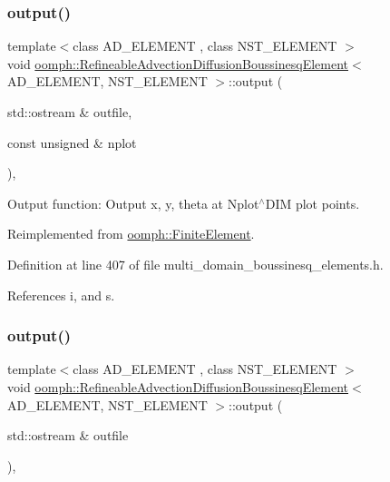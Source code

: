 \subsubsection{\texorpdfstring{output()}{output()}\hspace{0.1cm}{\footnotesize\ttfamily [1/4]}}
{\footnotesize\ttfamily template$<$class A\+D\+\_\+\+E\+L\+E\+M\+E\+NT , class N\+S\+T\+\_\+\+E\+L\+E\+M\+E\+NT $>$ \\
void \hyperlink{classoomph_1_1RefineableAdvectionDiffusionBoussinesqElement}{oomph\+::\+Refineable\+Advection\+Diffusion\+Boussinesq\+Element}$<$ A\+D\+\_\+\+E\+L\+E\+M\+E\+NT, N\+S\+T\+\_\+\+E\+L\+E\+M\+E\+NT $>$\+::output (\begin{DoxyParamCaption}\item[{std\+::ostream \&}]{outfile,  }\item[{const unsigned \&}]{nplot }\end{DoxyParamCaption})\hspace{0.3cm}{\ttfamily [inline]}, {\ttfamily [virtual]}}



Output function\+: Output x, y, theta at Nplot$^\wedge$\+D\+IM plot points. 



Reimplemented from \hyperlink{classoomph_1_1FiniteElement_afa9d9b2670f999b43e6679c9dd28c457}{oomph\+::\+Finite\+Element}.



Definition at line 407 of file multi\+\_\+domain\+\_\+boussinesq\+\_\+elements.\+h.



References i, and s.

\mbox{\label{classoomph_1_1RefineableAdvectionDiffusionBoussinesqElement_ae56c984aaa1aeddf1f458e700ffbe6a1}} 
\subsubsection{\texorpdfstring{output()}{output()}\hspace{0.1cm}{\footnotesize\ttfamily [2/4]}}
{\footnotesize\ttfamily template$<$class A\+D\+\_\+\+E\+L\+E\+M\+E\+NT , class N\+S\+T\+\_\+\+E\+L\+E\+M\+E\+NT $>$ \\
void \hyperlink{classoomph_1_1RefineableAdvectionDiffusionBoussinesqElement}{oomph\+::\+Refineable\+Advection\+Diffusion\+Boussinesq\+Element}$<$ A\+D\+\_\+\+E\+L\+E\+M\+E\+NT, N\+S\+T\+\_\+\+E\+L\+E\+M\+E\+NT $>$\+::output (\begin{DoxyParamCaption}\item[{std\+::ostream \&}]{outfile }\end{DoxyParamCaption})\hspace{0.3cm}{\ttfamily [inline]}, {\ttfamily [virtual]}}



